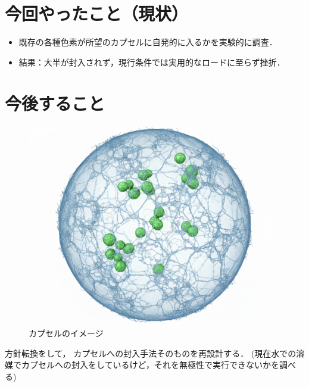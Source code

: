 \documentclass[dvipdfmx]{jsarticle}
\begin{document}
\section{今回やったこと（現状）}
\begin{itemize}
  \item 既存の各種色素が所望のカプセルに自発的に入るかを実験的に調査．
  \item 結果：大半が封入されず，現行条件では実用的なロードに至らず挫折．
\end{itemize}

\section{今後すること}

\begin{figure}
\centering
\vspace{-40pt}
\includegraphics[scale= 0.10]{dotgraph.png} 
\caption{カプセルのイメージ}
\end{figure}

方針転換をして，
カプセルへの封入手法そのものを再設計する．
(現在水での溶媒でカプセルへの封入をしているけど，それを無極性で実行できないかを調べる)
\end{document}
